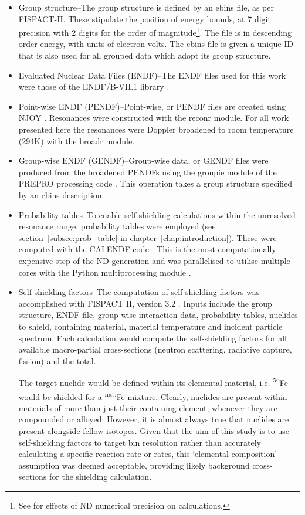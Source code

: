 \begin{itemize}
\item Group structure--The group structure is defined by an ebins file, as per FISPACT-II. These stipulate the position of energy bounds, at 7 digit precision with 2 digits for the order of magnitude\footnote{See \cite{Cullen1988} for effects of ND numerical precision on calculations.}. The file is in descending order energy, with units of electron-volts. The ebins file is given a unique ID that is also used for all grouped data which adopt its group structure.
\item Evaluated Nuclear Data Files (ENDF)--The ENDF files used for this work were those of the ENDF/B-VII.1 library \cite{Chadwick2011}.
\item Point-wise ENDF (PENDF)--Point-wise, or PENDF files are created using NJOY \cite{MacFarlane2016}. Resonances were constructed with the reconr module. For all work presented here the resonances were Doppler broadened to room temperature (294K) with the broadr module. 
\item Group-wise ENDF (GENDF)--Group-wise data, or GENDF files were produced from the broadened PENDFs using the groupie module of the PREPRO processing code \cite{cullen2017}. This operation takes a group structure specified by an ebins description.
\item Probability tables--To enable self-shielding calculations within the unresolved resonance range, probability tables were employed (see section~\ref{subsec:prob_table} in chapter~\ref{chap:introduction}). These were computed with the CALENDF code \cite{sublet2011}. This is the most computationally expensive step of the ND generation and was parallelised to utilise multiple cores with the Python multiprocessing module \cite{multiprocessing2018}.
\item Self-shielding factors--The computation of self-shielding factors was accomplished with FISPACT II, version 3.2 \cite{sublet2017a}. Inputs include the group structure, ENDF file, group-wise interaction data, probability tables, nuclides to shield, containing material, material temperature and incident particle spectrum. Each calculation would compute the self-shielding factors for all available macro-partial cross-sections (neutron scattering, radiative capture, fission) and the total. 

The target nuclide would be defined within its elemental material, i.e. \textsuperscript{56}Fe would be shielded for a \textsuperscript{nat.}Fe mixture. Clearly, nuclides are present within materials of more than just their containing element, whenever they are compounded or alloyed. However, it is almost always true that nuclides are present alongside fellow isotopes. Given that the aim of this study is to use self-shielding factors to target bin resolution rather than accurately calculating a specific reaction rate or rates, this `elemental composition' assumption was deemed acceptable, providing likely background cross-sections for the shielding calculation. 


\end{itemize}
